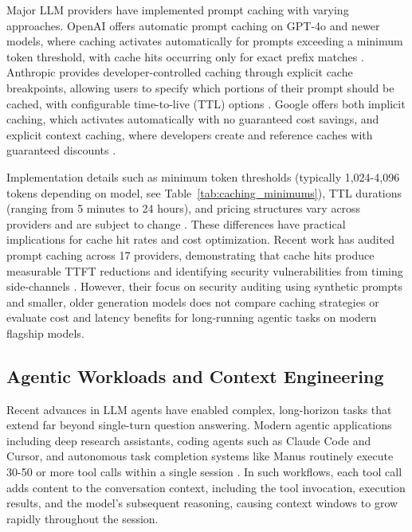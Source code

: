 \documentclass{article}
\theoremstyle{plain}
\theoremstyle{definition}
\theoremstyle{remark}
\begin{document}
Major LLM providers have implemented prompt caching with varying approaches. OpenAI offers automatic prompt caching on GPT-4o and newer models, where caching activates automatically for prompts exceeding a minimum token threshold, with cache hits occurring only for exact prefix matches \citep{openai_prompt_caching_docs, openai_prompt_caching_blog_2024}. Anthropic provides developer-controlled caching through explicit cache breakpoints, allowing users to specify which portions of their prompt should be cached, with configurable time-to-live (TTL) options \citep{anthropic_prompt_caching_docs, anthropic_prompt_caching_blog_2025}. Google offers both implicit caching, which activates automatically with no guaranteed cost savings, and explicit context caching, where developers create and reference caches with guaranteed discounts \citep{google_vertex_context_cache_overview, google_gemini_implicit_caching_blog_2025}.


Implementation details such as minimum token thresholds (typically 1,024-4,096 tokens depending on model, see Table~\ref{tab:caching_minimums}), TTL durations (ranging from 5 minutes to 24 hours), and pricing structures vary across providers and are subject to change \citep{prompthub_prompt_caching_2025, Azure2025}. These differences have practical implications for cache hit rates and cost optimization. Recent work has audited prompt caching across 17 providers, demonstrating that cache hits produce measurable TTFT reductions and identifying security vulnerabilities from timing side-channels \citep{gu2025auditingpromptcachinglanguage}. However, their focus on security auditing using synthetic prompts and smaller, older generation models does not compare caching strategies or evaluate cost and latency benefits for long-running agentic tasks on modern flagship models.

\subsection{Agentic Workloads and Context Engineering}
\label{subsec:agentic_workloads}

Recent advances in LLM agents have enabled complex, long-horizon tasks that extend far beyond single-turn question answering. Modern agentic applications including deep research assistants, coding agents such as Claude Code and Cursor, and autonomous task completion systems like Manus routinely execute 30-50 or more tool calls within a single session \citep{ji2025manus_context_engineering, du2025deepresearchbenchcomprehensivebenchmark, mialon2023gaia, zhou2023webarena, drouin2024workarena, wei2025browsecomp}. In such workflows, each tool call adds content to the conversation context, including the tool invocation, execution results, and the model's subsequent reasoning, causing context windows to grow rapidly throughout the session.
\end{document}
